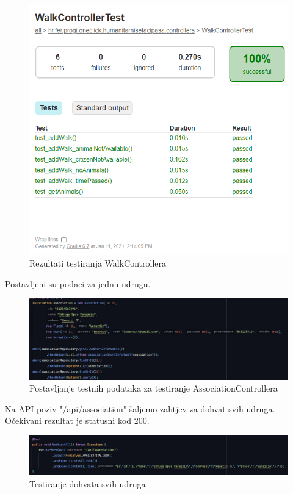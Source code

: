 	\begin{figure}[H]
		\includegraphics[width=\linewidth]{slike/Testovi-16.png}
		\centering
		\caption{Rezultati testiranja WalkControllera}
		\label{fig:testovi16}
	\end{figure}

	\eject
	
	\noindent Postavljeni su podaci za jednu udrugu. 
	
	\begin{figure}[H]
		\includegraphics[width=\linewidth]{slike/Testovi-12.png}
		\centering
		\caption{Postavljanje testnih podataka za testiranje AssociationControllera}
		\label{fig:testovi12}
	\end{figure}


	\noindent Na API poziv "/api/association" šaljemo zahtjev za  dohvat svih udruga. Očekivani rezultat je statusni kod 200.

	\begin{figure}[H]
		\includegraphics[width=\linewidth]{slike/Testovi-13.png}
		\centering
		\caption{Testiranje dohvata svih udruga}
		\label{fig:testovi13}
	\end{figure}

